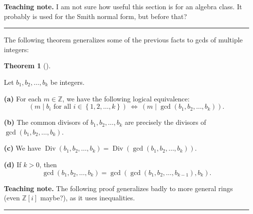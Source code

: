 \documentclass[numbers=enddot,12pt,final,onecolumn,notitlepage]{scrartcl}%
\numberwithin{exer}{subsection}
\theoremstyle{definition}
\newtheorem{theo}{Theorem}[subsection]
\newenvironment{theorem}[1][]
{\begin{theo}[#1]\begin{leftbar}}
{\end{leftbar}\end{theo}}
\newenvironment{teachingnote}[1][Teaching note]{\noindent\textbf{#1.} }{\ \rule{0.5em}{0.5em}}
\newenvironment{teachingnote}{}{}
\begin{document}
\begin{teachingnote}
I am not sure how useful this section is for an algebra class. It probably is
used for the Smith normal form, but before that?
\end{teachingnote}

The following theorem generalizes some of the previous facts to gcds of
multiple integers:

\begin{theorem}
\label{thm.ent.gcd.uniprop-mul}Let $b_{1},b_{2},\ldots,b_{k}$ be integers.

\textbf{(a)} For each $m\in\mathbb{Z}$, we have the following logical
equivalence:%
\[
\left(  m\mid b_{i}\text{ for all }i\in\left\{  1,2,\ldots,k\right\}  \right)
\ \Longleftrightarrow\ \left(  m\mid\gcd\left(  b_{1},b_{2},\ldots
,b_{k}\right)  \right)  .
\]


\textbf{(b)} The common divisors of $b_{1},b_{2},\ldots,b_{k}$ are precisely
the divisors of $\gcd\left(  b_{1},b_{2},\ldots,b_{k}\right)  $.

\textbf{(c)} We have $\operatorname*{Div}\left(  b_{1},b_{2},\ldots
,b_{k}\right)  =\operatorname*{Div}\left(  \gcd\left(  b_{1},b_{2}%
,\ldots,b_{k}\right)  \right)  $.

\textbf{(d)} If $k>0$, then%
\[
\gcd\left(  b_{1},b_{2},\ldots,b_{k}\right)  =\gcd\left(  \gcd\left(
b_{1},b_{2},\ldots,b_{k-1}\right)  ,b_{k}\right)  .
\]

\end{theorem}

\begin{teachingnote}
The following proof generalizes badly to more general rings (even
$\mathbb{Z}\left[  i\right]  $ maybe?), as it uses inequalities.
\end{teachingnote}
\end{document}
